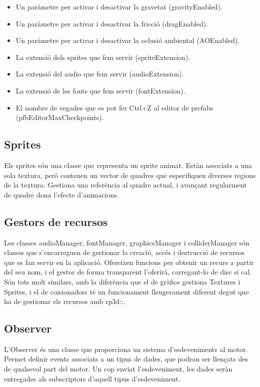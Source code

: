 \begin{itemize}
  \item Un paràmetre per activar i desactivar la gravetat (gravityEnabled).
  \item Un paràmetre per activar i desactivar la fricció (dragEnabled).
  \item Un paràmetre per activar i desactivar la oclusió ambiental (AOEnabled).
  \item La extensió dels sprites que fem servir (spriteExtension).
  \item La extensió del audio que fem servir (audioExtension).
  \item La extensió de les fonts que fem servir (fontExtension).
  \item El nombre de vegades que es pot fer Ctrl+Z al editor de prefabs (pfbEditorMaxCheckpoints).
\end{itemize}

\subsection{Sprites}
Els sprites són una classe que representa un sprite animat. Estàn associats a una sola textura, però contenen un vector de quadres que especifiquen diverses regions de la textura. Gestiona una referència al quadre actual, i avançant regularment de quadre dona l'efecte d'animacions.
\subsection{Gestors de recursos}
Les classes audioManager, fontManager, graphicsManager i colliderManager són classes que s'encarreguen de gestionar la creació, accés i destrucció de recursos que es fan servir en la aplicació. Ofereixen funcions per obtenir un recurs a partir del seu nom, i el gestor de forma transparent l'oferirà, carregant-lo de disc si cal.
Són tots molt similars, amb la diferència que el de gràfics gestiona Textures i Sprites, i el de co\lgem isionadors té un funcionament lleugerament diferent degut que ha de gestionar els recursos amb rp3d::.
\subsection{Observer}
L'Observer és una classe que proporciona un sistema d'esdeveniments al motor. Permet definir events associats a un tipus de dades, que podran ser llençats des de qualsevol part del motor. Un cop enviat l'esdeveniment, les dades seràn entregades als subscriptors d'aquell tipus d'esdeveniment.

